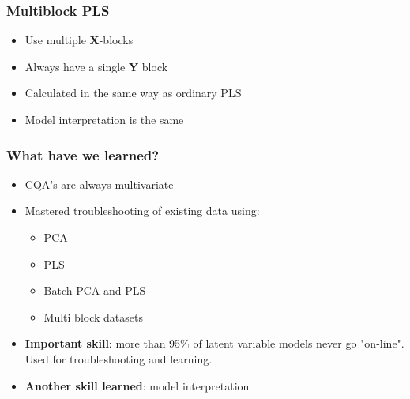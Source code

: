 \begin{frame}\frametitle{Multiblock PLS}

\begin{itemize}
	\item	Use multiple \( \mathbf{X}\)-blocks
	
	\item	Always have a single \( \mathbf{Y}\) block
	
	\item	Calculated in the same way as ordinary PLS
	
	\item	Model interpretation is the same
\end{itemize}


\end{frame}

\begin{frame}\frametitle{What have we learned?}

\begin{itemize}
	\item	CQA's are always multivariate
	
	\item	Mastered troubleshooting of existing data using:
	
	\begin{itemize}
		\item	PCA
		
		\item	PLS
		
		\item	Batch PCA and PLS
		
		\item	Multi block datasets
	\end{itemize}
	
	\item	\textbf{Important skill}: more than 95\%  of latent variable models never go "on-line". Used for troubleshooting and learning.

	\item	\textbf{Another skill learned}: model interpretation 
\end{itemize}

\end{frame}